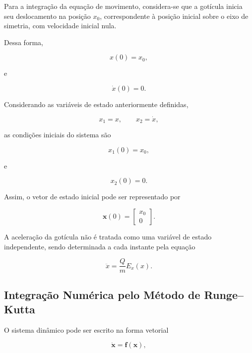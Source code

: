 \documentclass[12pt,a4paper]{article}
\begin{document}
Para a integração da equação de movimento, considera-se que a gotícula inicia
seu deslocamento na posição $x_0$, correspondente à posição inicial sobre o
eixo de simetria, com velocidade inicial nula.

Dessa forma,

\begin{equation}
x(0) = x_0,
\end{equation}

e

\begin{equation}
\dot{x}(0) = 0.
\end{equation}

Considerando as variáveis de estado anteriormente definidas,

\begin{equation}
x_1 = x,
\qquad
x_2 = \dot{x},
\end{equation}

as condições iniciais do sistema são

\begin{equation}
x_1(0) = x_0,
\end{equation}

e

\begin{equation}
x_2(0) = 0.
\end{equation}

Assim, o vetor de estado inicial pode ser representado por

\begin{equation}
\mathbf{x}(0)
=
\begin{bmatrix}
x_0\\
0
\end{bmatrix}.
\end{equation}

A aceleração da gotícula não é tratada como uma variável de estado
independente, sendo determinada a cada instante pela equação

\begin{equation}
\ddot{x}
=
\frac{Q}{m}E_x(x).
\end{equation}

\subsection{Integração Numérica pelo Método de Runge--Kutta}

O sistema dinâmico pode ser escrito na forma vetorial

\begin{equation}
\dot{\mathbf{x}}
=
\mathbf{f}(\mathbf{x}),
\end{equation}
\end{document}
